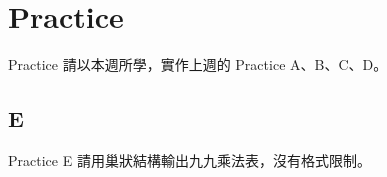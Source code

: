 \documentclass[t]{beamer}
\begin{document}
\section{Practice}
\begin{frame}{Practice}
  請以本週所學，實作上週的 Practice A、B、C、D。
\end{frame}

\subsection{E}
\begin{frame}{Practice E}
  請用巢狀結構輸出九九乘法表，沒有格式限制。
\end{frame}
\end{document}
